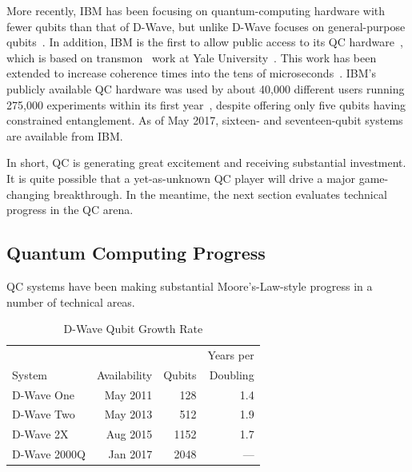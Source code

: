 More recently, IBM has been focusing on quantum-computing hardware with
fewer qubits than that of D-Wave, but unlike D-Wave focuses on
general-purpose
qubits~\cite{BradJones2017IBM-QC-Announce,RobertHackett2017IBM-QC-Announce,AgamShah2017IBM-QC-50-qubit,DarioGill2017IBM-Universal-QC}.
In addition, IBM is the first to allow public access to its QC
hardware~\cite{IBM2016QuantumExperience,ArsTechnica2016IBMQuantumExperience,MikeVizard2017IBM-QC-Cloud},
which is based on transmon~\cite{WikipediaTransMon} work at
Yale University~\cite{PhysRevA.76.042319}.
This work has been extended
to increase coherence times into the tens of
microseconds~\cite{PhysRevLett.107.240501,PhysRevLett.111.080502,PhysRevB.86.100506}.
IBM's publicly available QC hardware was used by about 40,000 different
users running 275,000 experiments within its first
year~\cite{SeanMichaelKerner2017IBM-QC-API},
despite offering only five qubits having constrained entanglement.
As of May 2017, sixteen- and seventeen-qubit systems are available
from IBM.

In short, QC is generating great excitement and receiving substantial
investment.
It is quite possible that a yet-as-unknown QC player will drive a
major game-changing breakthrough.
In the meantime, the next section evaluates technical progress in the
QC arena.

\subsection{Quantum Computing Progress}
\label{sec:future:Quantum Computing Progress}

QC systems have been making substantial Moore's-Law-style progress
in a number of technical areas.

\begin{table}
\centering\footnotesize
\begin{tabular}{l|r|r|r}
	&	&	& Years per \\
System
	& Availability
		& Qubits
			& Doubling \\
\hline
\hline
D-Wave One
	& May 2011
		& 128
			& 1.4 \\
\hline
D-Wave Two
	& May 2013
		& 512
			& 1.9 \\
\hline
D-Wave 2X
	& Aug 2015
		& 1152
			& 1.7 \\
\hline
D-Wave 2000Q
	& Jan 2017
		& 2048
			& --- \\
\end{tabular}
\caption{D-Wave Qubit Growth Rate}
\label{tab:future:D-Wave Qubit Growth Rate}
\end{table}

